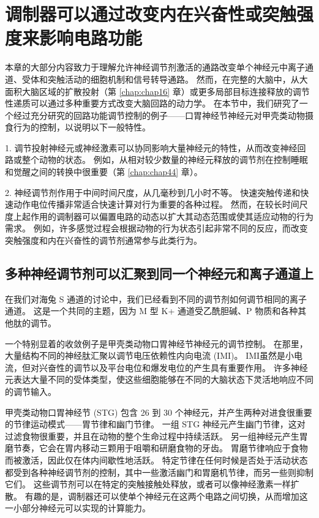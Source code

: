 \section{调制器可以通过改变内在兴奋性或突触强度来影响电路功能}

本章的大部分内容致力于理解允许神经调节剂激活的通路改变单个神经元中离子通道、受体和突触活动的细胞机制和信号转导通路。 
然而，在完整的大脑中，从大面积大脑区域的扩散投射（第 \ref{chap:chap16} 章）或更多局部目标连接释放的调节性递质可以通过多种重要方式改变大脑回路的动力学。 
在本节中，我们研究了一个经过充分研究的回路功能调节控制的例子——口胃神经节神经元对甲壳类动物摄食行为的控制，以说明以下一般特性。


1. 调节投射神经元或神经激素可以协同影响大量神经元的特性，从而改变神经回路或整个动物的状态。 
例如，从相对较少数量的神经元释放的调节剂在控制睡眠和觉醒之间的转换中很重要（第 \ref{chap:chap44} 章）。 


2. 神经调节剂作用于中间时间尺度，从几毫秒到几小时不等。 快速突触传递和快速动作电位传播非常适合快速计算对行为重要的各种过程。 
然而，在较长时间尺度上起作用的调制器可以偏置电路的动态以扩大其动态范围或使其适应动物的行为需求。 
例如，许多感觉过程会根据动物的行为状态引起非常不同的反应，而改变突触强度和内在兴奋性的调节剂通常参与此类行为。


\subsection{多种神经调节剂可以汇聚到同一个神经元和离子通道上}
在我们对海兔 S 通道的讨论中，我们已经看到不同的调节剂如何调节相同的离子通道。 这是一个共同的主题，因为 M 型 K+ 通道受乙酰胆碱、P 物质和各种其他肽的调节。

一个特别显着的收敛例子是甲壳类动物口胃神经节神经元的调节控制。 在那里，大量结构不同的神经肽汇聚以调节电压依赖性内向电流 (IMI)。 IMI虽然是小电流，但对兴奋性的调节以及平台电位和爆发电位的产生具有重要作用。 许多神经元表达大量不同的受体类型，使这些细胞能够在不同的大脑状态下灵活地响应不同的调节输入。

甲壳类动物口胃神经节 (STG) 包含 26 到 30 个神经元，并产生两种对进食很重要的节律运动模式——胃节律和幽门节律。 一组 STG 神经元产生幽门节律，这对过滤食物很重要，并且在动物的整个生命过程中持续活跃。 另一组神经元产生胃磨节奏，它会在胃内移动三颗用于咀嚼和研磨食物的牙齿。 胃磨节律响应于食物而被激活，因此仅在体内间歇性地活跃。 特定节律在任何时候是否处于活动状态都受到各种神经调节剂的控制，其中一些激活幽门和胃磨机节律，而另一些则抑制它们。 这些调节剂可以在特定的突触接触处释放，或者可以像神经激素一样扩散。 有趣的是，调制器还可以使单个神经元在这两个电路之间切换，从而增加这一小部分神经元可以实现的计算能力。

